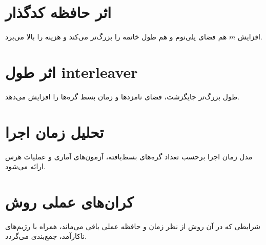 \section{اثر حافظه کدگذار}
افزایش \(m\) هم فضای پلی‌نوم و هم طول خاتمه را بزرگ‌تر می‌کند و هزینه را بالا می‌برد.

\section{اثر طول interleaver}
طول بزرگ‌تر جایگزشت، فضای نامزدها و زمان بسط گره‌ها را افزایش می‌دهد.

\section{تحلیل زمان اجرا}
مدل زمان اجرا برحسب تعداد گره‌های بسط‌یافته، آزمون‌های آماری و عملیات هرس ارائه می‌شود.

\section{کران‌های عملی روش}
شرایطی که در آن روش از نظر زمان و حافظه عملی باقی می‌ماند، همراه با رژیم‌های ناکارآمد، جمع‌بندی می‌گردد.
